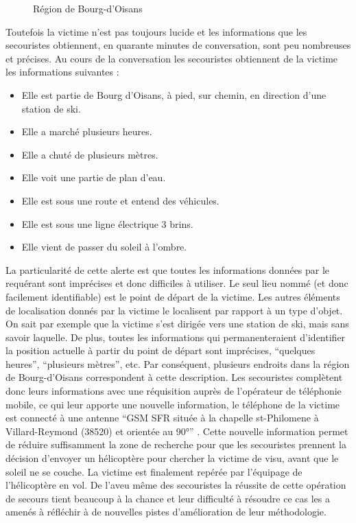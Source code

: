 \begin{figure}
  \centering
  
  \caption{Région de Bourg-d'Oisans}
  \label{fig:fil_rouge}
\end{figure}

Toutefois la victime n'est pas toujours lucide et les informations que
les secouristes obtiennent, en quarante minutes de conversation, sont
peu nombreuses et précises. Au cours de la conversation les
secouristes obtiennent de la victime les informations suivantes :

\begin{itemize}
\item Elle est partie de Bourg d'Oisans, à pied, sur chemin, en
  direction d'une station de ski.
\item Elle a marché plusieurs heures.
\item Elle a chuté de plusieurs mètres.
\item Elle voit une partie de plan d'eau.
\item Elle est sous une route et entend des véhicules.
\item Elle est sous une ligne électrique 3 brins.
\item Elle vient de passer du soleil à l'ombre.
\end{itemize}

La particularité de cette alerte est que toutes les informations
données par le requérant sont imprécises et donc difficiles à
utiliser. Le seul lieu nommé (et donc facilement identifiable) est le
point de départ de la victime. Les autres éléments de localisation
donnés par la victime le localisent par rapport à un type d'objet. On
sait par exemple que la victime s'est dirigée vers une station de ski,
mais sans savoir laquelle. De plus, toutes les informations qui
permanenteraient d'identifier la position actuelle à partir du point
de départ sont imprécises, \enquote{quelques heures},
\enquote{plusieurs mètres}, etc. Par conséquent, plusieurs endroits
dans la région de Bourg-d'Oisans correspondent à cette
description. Les secouristes complètent donc leurs informations avec
une réquisition auprès de l'opérateur de téléphonie mobile, ce qui
leur apporte une nouvelle information, le téléphone de la victime est
connecté à une antenne \enquote{GSM SFR située à la chapelle
  st-Philomene à Villard-Reymond (\num{38520}) et orientée au 90°}
\autocite{Lot 0.4}. Cette nouvelle information permet de réduire
suffisamment la zone de recherche pour que les secouristes prennent la
décision d'envoyer un hélicoptère pour chercher la victime de visu,
avant que le soleil ne se couche.
La victime est finalement repérée par l'équipage de l'hélicoptère en
vol. De l'aveu même des secouristes la réussite de cette opération de
secours tient beaucoup à la chance et leur difficulté à résoudre ce
cas les a amenés à réfléchir à de nouvelles pistes d'amélioration de
leur méthodologie.

